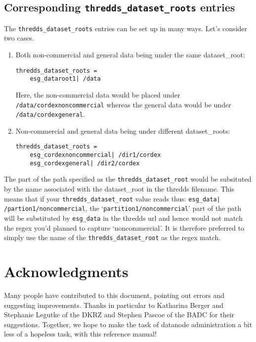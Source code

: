 \subsection{Corresponding \texttt{thredds\_dataset\_roots} entries}
The \texttt{thredds\_dataset\_roots} entries can be set up in many ways.  Let's consider two cases.
\begin{enumerate}
\item Both non-commercial and general data being under the same dataset\_root:
\begin{verbatim}
thredds_dataset_roots =
	esg_dataroot1| /data
\end{verbatim}
Here, the non-commercial data would be placed under \texttt{/data/cordexnoncommercial} whereas the general data would be under \texttt{/data/cordexgeneral}.
\item Non-commercial and general data being under different dataset\_roots:
\begin{verbatim}
thredds_dataset_roots =
	esg_cordexnoncommercial| /dir1/cordex
	esg_cordexgeneral| /dir2/cordex
\end{verbatim}
\end{enumerate}
 The part of the path specified as the \texttt{thredds\_dataset\_root} would be subsituted by the name associated with the dataset\_root in the thredds filename. This means that if your \texttt{thredds\_dataset\_root} value reads thus: \texttt{esg\_data| /partion1/noncommercial}, the `\texttt{partition1/noncommercial}' part of the path will be substituted by \texttt{esg\_data} in the thredds url and hence would not match the regex you'd planned to capture `noncommercial'.  It is therefore preferred to simply use the name of the \texttt{thredds\_dataset\_root} as the regex match.
\section{Acknowledgments}
Many people have contributed to this document, pointing out errors and suggesting improvements. Thanks in particular to Katharina Berger and Stephanie Legutke of the DKRZ and Stephen Pascoe of the BADC for their suggestions.  Together, we hope to make the task of datanode administration a bit less of a hopeless task, with this reference manual!
